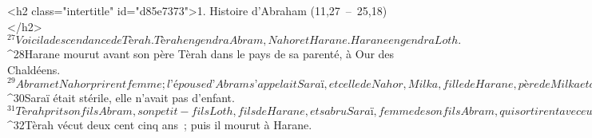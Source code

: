   
  
      <h2 class="intertitle" id="d85e7373">1. Histoire d’Abraham (11,27 – 25,18)</h2>
${}^{27}Voici la descendance de Tèrah. Tèrah engendra Abram, Nahor et Harane. Harane engendra Loth. 
${}^{28}Harane mourut avant son père Tèrah dans le pays de sa parenté, à Our des Chaldéens. 
${}^{29}Abram et Nahor prirent femme ; l’épouse d’Abram s’appelait Saraï, et celle de Nahor, Milka, fille de Harane, père de Milka et de Yiska. 
${}^{30}Saraï était stérile, elle n’avait pas d’enfant.
${}^{31}Tèrah prit son fils Abram, son petit-fils Loth, fils de Harane, et sa bru Saraï, femme de son fils Abram, qui sortirent avec eux d’Our des Chaldéens pour aller au pays de Canaan. Ils gagnèrent Harane où ils s’établirent. 
${}^{32}Tèrah vécut deux cent cinq ans ; puis il mourut à Harane.
      
